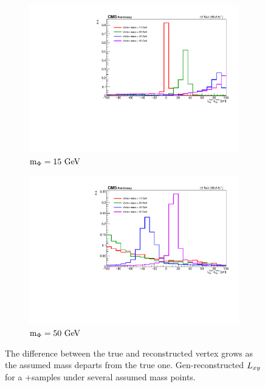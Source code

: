 \begin{figure}[htb!]
	\centering
	\captionsetup[subfigure]{justification=centering}
	\begin{subfigure}[h]{0.45\linewidth}
		\centering
		\includegraphics[width=\linewidth]{figs/05_analysis/2018_deltaLxy_Z_m15.pdf}
		\caption{$\mphi=15\unit{GeV}$}
	\end{subfigure}
	\begin{subfigure}[h]{0.45\linewidth}
		\centering
		\includegraphics[width=\linewidth]{figs/05_analysis/2018_deltaLxy_Z_m50.pdf}
		\caption{$\mphi=50\unit{GeV}$}
	\end{subfigure}
	\caption[The difference between the true and reconstructed vertex grows as the assumed mass departs from the true one. Gen-reconstructed $\lxy$ for a \VZ+\VH samples under several assumed mass points.]{The difference between the true and reconstructed vertex grows as the assumed mass departs from the true one. Gen-reconstructed $\lxy$ for a \VZ+\VH samples under several assumed mass points.}
	\label{fig:deltaLxy}
\end{figure}

